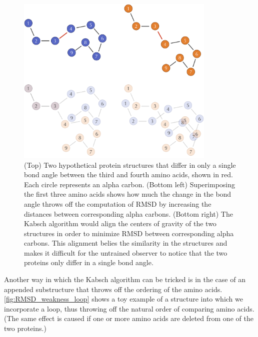 \begin{figure}[p]
	\centering
	\mySfFamily
	\includegraphics[width = 0.85\textwidth]{../images/RMSD_weakness_mutation.png}
	\caption{(Top) Two hypothetical protein structures that differ in only a single bond angle between the third and fourth amino acids, shown in red. Each circle represents an alpha carbon. (Bottom left) Superimposing the first three amino acids shows how much the change in the bond angle throws off the computation of RMSD by increasing the distances between corresponding alpha carbons. (Bottom right) The Kabsch algorithm would align the centers of gravity of the two structures in order to minimize RMSD between corresponding alpha carbons. This alignment belies the similarity in the structures and makes it difficult for the untrained observer to notice that the two proteins only differ in a single bond angle.}
	\label{fig:RMSD_weakness_mutation}
\end{figure}

Another way in which the Kabsch algorithm can be tricked is in the case of an appended substructure that throws off the ordering of the amino acids. \autoref{fig:RMSD_weakness_loop} shows a toy example of a structure into which we incorporate a loop, thus throwing off the natural order of comparing amino acids. (The same effect is caused if one or more amino acids are deleted from one of the two proteins.)

